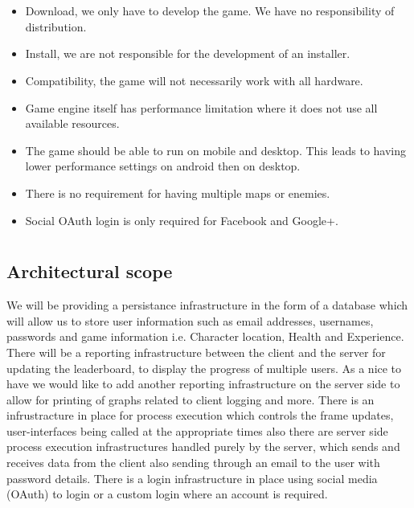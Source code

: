 \documentclass[letterpaper]{article}
\begin{document}
		\section*{\colorbox{blue}{}} 
		\vspace{0.2in}
		
		\begin{itemize}
  		\item Download, we only have to develop the game. We have no responsibility of distribution.
  		\item Install, we are not responsible for the development of an installer.
  		\item Compatibility, the game will not necessarily work with all hardware.
  		\item Game engine itself has performance limitation where it does not use all available resources.
  		\item The game should be able to run on mobile and desktop. This leads to having lower performance settings on android then on desktop.
  		\item There is no requirement for having multiple maps or enemies.
  		\item Social OAuth login is only required for Facebook and Google+.
		\end{itemize}
		
		\section*{\colorbox{blue}{}} 
		\vspace{0.1in}
			
			\subsection*{ Architectural scope }
			\vspace{0.1in}	
			We will be providing a persistance infrastructure in the form of a database which will allow us to store user information such as email addresses, usernames, passwords and game information i.e. Character location, Health and Experience. There will be a reporting infrastructure between the client and the server for updating the leaderboard, to display the progress of multiple users. As a nice to have we would like to add another reporting infrastructure on the server side to allow for printing of graphs related to client logging and more. There is an infrustracture in place for process execution which controls the frame updates, user-interfaces being called at the appropriate times also there are server side process execution infrastructures handled purely by the server, which sends and receives data from the client also sending through an email to the user with password details. There is a login infrastructure in place using social media (OAuth) to login or a custom login where an account is required. 
				
\end{document}
